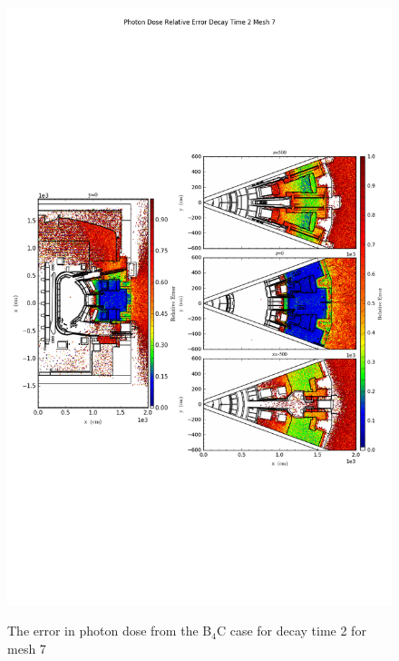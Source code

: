 \begin{figure}[ht!]
\centering
\includegraphics[trim={0cm 9cm 0cm 10cm},clip,scale=0.75]{../plots/final_model_with_b4c/Photon_Dose_Relative_Error_Decay_Time_2_Mesh_7.png}
\label{fig:photons_dc2_no4bc_m7_error}
\caption{The error in photon dose from the B$_4$C case for decay time 2 for mesh 7}
\end{figure}
